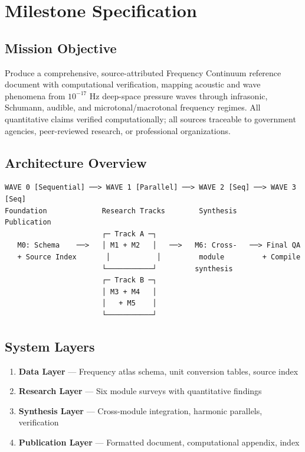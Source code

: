 \documentclass[11pt,letterpaper]{article}
\newcommand{\stageheader}[2]{%
  \noindent\colorbox{#2}{\makebox[\textwidth][l]{%
    \textcolor{white}{\bfseries\sffamily\hspace{6pt}#1\hspace{6pt}}}}%
  \vspace{0.5em}\par%
}
\begin{document}
\newpage

\stageheader{STAGE 3 --- MISSION PACKAGE}{tertiary}

\section{Milestone Specification}

\subsection{Mission Objective}

Produce a comprehensive, source-attributed Frequency Continuum reference document with computational verification, mapping acoustic and wave phenomena from $10^{-17}$ Hz deep-space pressure waves through infrasonic, Schumann, audible, and microtonal/macrotonal frequency regimes. All quantitative claims verified computationally; all sources traceable to government agencies, peer-reviewed research, or professional organizations.

\subsection{Architecture Overview}

\begin{asciibox}
\begin{verbatim}
WAVE 0 [Sequential] ──> WAVE 1 [Parallel] ──> WAVE 2 [Seq] ──> WAVE 3 [Seq]
Foundation             Research Tracks        Synthesis       Publication
                       ┌─ Track A ─┐
   M0: Schema    ──>   │ M1 + M2   │   ──>   M6: Cross-   ──> Final QA
   + Source Index       │           │         module         + Compile
                       └───────────┘         synthesis
                       ┌─ Track B ─┐
                       │ M3 + M4   │
                       │   + M5    │
                       └───────────┘
\end{verbatim}
\end{asciibox}

\subsection{System Layers}

\begin{enumerate}[leftmargin=2em]
\item \textbf{Data Layer} --- Frequency atlas schema, unit conversion tables, source index
\item \textbf{Research Layer} --- Six module surveys with quantitative findings
\item \textbf{Synthesis Layer} --- Cross-module integration, harmonic parallels, verification
\item \textbf{Publication Layer} --- Formatted document, computational appendix, index
\end{enumerate}
\end{document}
